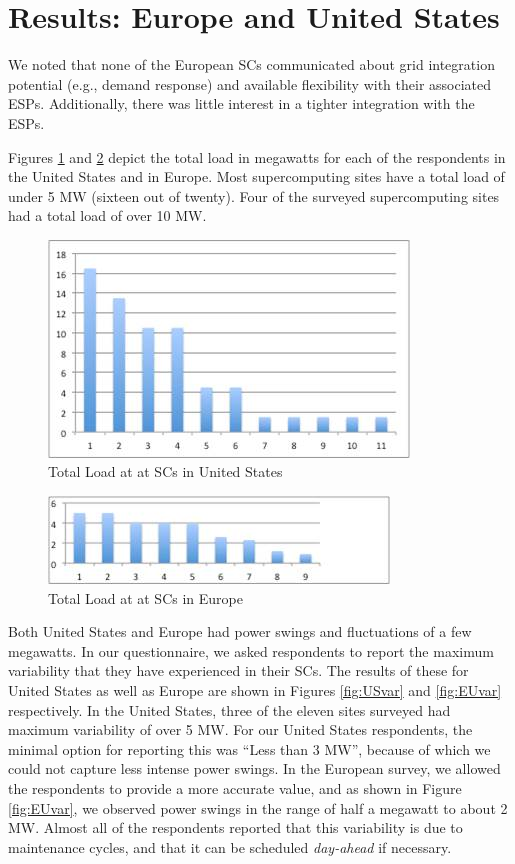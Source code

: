 \section{Results: Europe and United States}
\label{res}
We noted that none of the European SCs communicated about grid integration potential (e.g., demand response) and available flexibility with their associated ESPs. Additionally, there was little interest in a tighter integration with the ESPs.

Figures \ref{fig:USload} and \ref{fig:EUload} depict the total load in megawatts for each of the respondents in the United States and in Europe. Most supercomputing sites have a total load of under 5 MW (sixteen out of twenty). Four of the surveyed supercomputing sites had a total load of over 10 MW. 
\begin{figure}
\begin{center}
\includegraphics[scale=0.7]{figs/USLoad.jpg}
\caption{Total Load at at SCs in United States}
\label{fig:USload}
\end{center}
\end{figure}

\begin{figure}
\begin{center}
\includegraphics[scale=1]{figs/EULoad.jpg}
\caption{Total Load at at SCs in Europe}
\label{fig:EUload}
\end{center}
\end{figure}

Both United States and Europe had power swings and fluctuations of a few megawatts. In our questionnaire, we asked respondents to report the maximum variability that they have experienced in their SCs. The results of these for United States as well as Europe are shown in Figures \ref{fig:USvar} and \ref{fig:EUvar} respectively. In the United States, three of the eleven sites surveyed had maximum variability of over 5 MW. For our United States respondents, the minimal option for reporting this was ``Less than 3 MW'', because of which we could not capture less intense power swings. In the European survey, we allowed the respondents to provide a more accurate value, and as shown in Figure \ref{fig:EUvar}, we observed power swings in the range of half a megawatt to about 2 MW. Almost all of the respondents reported that this variability is due to maintenance cycles, and that it can be scheduled \emph{day-ahead} if necessary.

